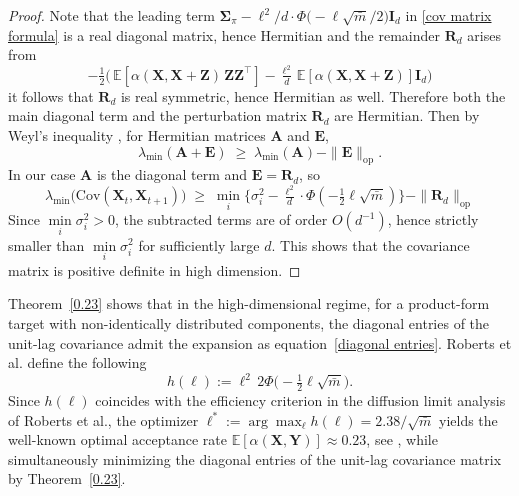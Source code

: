 \documentclass[conference]{IEEEtran}
\theoremstyle{definition}
\begin{document}
\begin{proof}
Note that the leading term \(
\boldsymbol\Sigma_{\pi} - \ell^2/d\cdot\Phi\!\Big(-\ell \sqrt{\bar m}/2\Big) \boldsymbol{I}_d\) in \eqref{cov matrix formula}
is a real diagonal matrix, hence Hermitian and the remainder $\boldsymbol R_d$ arises from 
\[
-\tfrac12\Big(\,\mathbb{E}[\alpha(\boldsymbol X,\boldsymbol X+\boldsymbol Z)\,\boldsymbol Z \boldsymbol Z^\top] 
- \tfrac{\ell^2}{d}\,\mathbb{E}[\alpha(\boldsymbol X,\boldsymbol X+\boldsymbol Z)] \boldsymbol I_d\Big)
\]
it follows that $\boldsymbol R_d$ is real symmetric, hence Hermitian as well. Therefore both the main diagonal term and the perturbation matrix \(\boldsymbol{R}_d\) are Hermitian. Then by Weyl’s inequality \cite{Horn_Johnson_2012}, for Hermitian matrices $\boldsymbol A$ and $\boldsymbol E$,
\[
\lambda_{\min}(\boldsymbol A+\boldsymbol E) \;\ge\; \lambda_{\min}(\boldsymbol A) - \|\boldsymbol E\|_{\mathrm{op}}.
\]
In our case $\boldsymbol A$ is the diagonal term and $\boldsymbol E=\boldsymbol R_d$, so
\[
\lambda_{\min}\!\big(\mathrm{Cov}(\boldsymbol X_t,\boldsymbol X_{t+1})\big)
\;\ge\; \min_i\!\Big\{\sigma_i^2 - \tfrac{\ell^2}{d}\cdot\Phi(-\tfrac12 \ell \sqrt{\bar m})\Big\}
- \|\boldsymbol R_d\|_{\mathrm{op}}
\]
Since $\min\limits_i\sigma_i^2>0$, the subtracted terms are of order $ O(d^{-1})$, hence strictly smaller than $\min\limits_i\sigma_i^2$ for sufficiently large $d$. This shows that the covariance matrix is positive definite in high dimension.
\end{proof}
Theorem~\ref{0.23} shows that in the high-dimensional regime, for a product-form target with non-identically distributed components, the diagonal entries of the unit-lag covariance admit the expansion as equation~\eqref{diagonal entries}. Roberts et al. define the following
\[
h(\ell):=\ell^2\,2\Phi\!\Big(-\tfrac12 \ell\sqrt{\bar m}\Big).
\]
Since $h(\ell)$ coincides with the efficiency criterion in the diffusion limit analysis of Roberts et al., the optimizer $\ell^* := \arg\max_{\ell} h(\ell) = 2.38/\sqrt{\bar m}$ yields the well-known optimal acceptance rate $\mathbb{E}[\alpha(\boldsymbol X,\boldsymbol Y)] \approx 0.23$, see \cite{RobertsandGelman}, while simultaneously minimizing the diagonal entries of the unit-lag covariance matrix by Theorem~\ref{0.23}.
\end{document}
